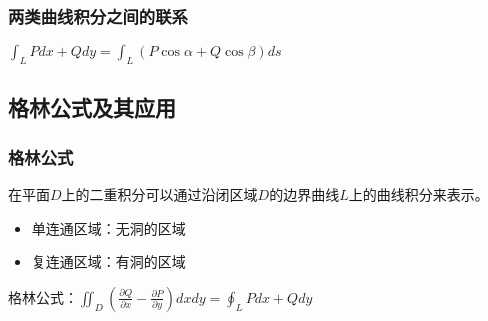 \documentclass{article} %
\begin{document}
\subsubsection{两类曲线积分之间的联系}
$\displaystyle \int_L Pdx+Qdy=\int_L(P\cos\alpha+Q\cos\beta)ds$
\par
\vspace{5mm}


\subsection{格林公式及其应用}
\subsubsection{格林公式}
在平面$D$上的二重积分可以通过沿闭区域$D$的边界曲线$L$上的曲线积分来表示。
\begin{itemize}
    \item 单连通区域：无洞的区域
    \item 复连通区域：有洞的区域
\end{itemize}
\par
格林公式：$\displaystyle \iint_D \left(\frac{\partial Q}{\partial x}-\frac{\partial P}{\partial y}\right)dxdy=\oint_L Pdx+Qdy$
\par


















\section{}
\subsection{}
\subsubsection{}
\end{document}

